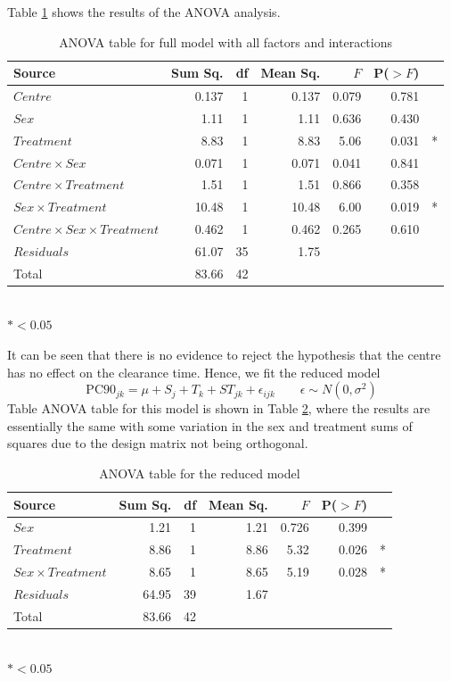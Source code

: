 Table \ref{pc90aov} shows the results of the ANOVA analysis.
\begin{table}[h]
\centering
\caption{ANOVA table for full model with all factors and interactions}\label{pc90aov}
\begin{tabular}{l|rrrrrl}
Source&Sum Sq.&df&Mean Sq.&$F$&P($>F$)\\
\hline
$Centre$     &                0.137  & 1& 0.137 & 0.079 & 0.781&\\
$Sex$        &              1.11& 1&   1.11 & 0.636 &0.430&\\
$Treatment$  &            8.83& 1&  8.83  &5.06& 0.031 &*\\
$Centre\times Sex$ &              0.071 & 1 &0.071 & 0.041 &0.841&\\
$Centre\times Treatment$ &        1.51 & 1 &1.51  &0.866 &0.358&\\
$Sex\times Treatment$     &     10.48 &1& 10.48  &6.00& 0.019 &*\\
$Centre\times Sex\times Treatment$ &   0.462  &1&0.462 & 0.265& 0.610&\\
$Residuals$      &    61.07   &35& 1.75  &&&\\
\hline
Total&83.66&42&&&
\end{tabular}\\
$*<0.05$
\end{table}
It can be seen that there is no evidence to reject the hypothesis that the centre has no effect on the clearance time. Hence, we fit the reduced model
\begin{equation}
\mathrm{PC}90_{jk}=\mu+S_j+T_k+ST_{jk}+\epsilon_{ijk}\quad\quad\epsilon\sim N(0,\sigma^2)\label{reduced}
\end{equation}
Table ANOVA table for this model is shown in Table \ref{aovreduced}, where the results are essentially the same with some variation in the sex and treatment sums of squares due to the design matrix not being orthogonal.
\begin{table}[h]
\centering
\caption{ANOVA table for the reduced model}\label{aovreduced}
\begin{tabular}{l|rrrrrl}
Source&Sum Sq.&df&Mean Sq.&$F$&P($>F$)\\
\hline
$Sex$        &              1.21   &1&1.21  &0.726& 0.399&\\
$Treatment$  &            8.86   &1&8.86  &5.32 &0.026 &*\\
$Sex\times Treatment$     &     8.65  & 1&8.65 & 5.19 &0.028&*\\
$Residuals$      &    64.95  &39& 1.67  &&&\\
\hline
Total&83.66&42&&&
\end{tabular}\\
$*<0.05$
\end{table}

